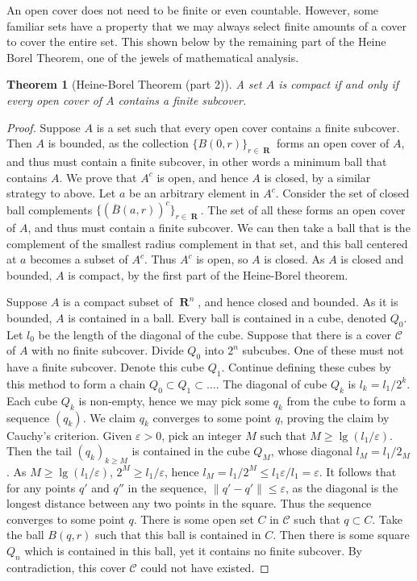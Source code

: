 \documentclass{report}
\newtheorem{theorem}{Theorem}[chapter]
\DeclareMathOperator{\real}{\mathbf{R}}
\begin{document}
An open cover does not need to be finite or even countable. However, some familiar sets have a property that we may always select finite amounts of a cover to cover the entire set. This shown below by the remaining part of the Heine Borel Theorem, one of the jewels of mathematical analysis.

\begin{theorem}[Heine-Borel Theorem (part 2)]
  A set $A$ is compact if and only if every open cover of $A$ contains a finite subcover.
\end{theorem}
\begin{proof}
  Suppose $A$ is a set such that every open cover contains a finite subcover. Then $A$ is bounded, as the collection $\{B(0,r)\}_{r \in \real}$ forms an open cover of $A$, and thus must contain a finite subcover, in other words a minimum ball that contains $A$. We prove that $A^c$ is open, and hence $A$ is closed, by a similar strategy to above. Let $a$ be an arbitrary element in $A^c$. Consider the set of closed ball complements $\{(\overline{B}(a,r))^c\}_{r \in \real}$. The set of all these forms an open cover of $A$, and thus must contain a finite subcover. We can then take a ball that is the complement of the smallest radius complement in that set, and this ball centered at $a$ becomes a subset of $A^c$. Thus $A^c$ is open, so $A$ is closed. As $A$ is closed and bounded, $A$ is compact, by the first part of the Heine-Borel theorem.

  Suppose $A$ is a compact subset of $\real^n$, and hence closed and bounded. As it is bounded, $A$ is contained in a ball. Every ball is contained in a cube, denoted $Q_0$. Let $l_0$ be the length of the diagonal of the cube. Suppose that there is a cover $\mathcal{C}$ of $A$ with no finite subcover. Divide $Q_0$ into $2^n$ subcubes. One of these must not have a finite subcover. Denote this cube $Q_1$. Continue defining these cubes by this method to form a chain $Q_0 \subset Q_1 \subset \dots$. The diagonal of cube $Q_k$ is $l_k = l_1/2^k$. Each cube $Q_k$ is non-empty, hence we may pick some $q_k$ from the cube to form a sequence $(q_k)$. We claim $q_k$ converges to some point $q$, proving the claim by Cauchy's criterion. Given $\varepsilon > 0$, pick an integer $M$ such that $M \geq \lg(l_1/\varepsilon)$. Then the tail $(q_k)_{k \geq M}$ is contained in the cube $Q_M$, whose diagonal $l_M = l_1/2_M$. As $M \geq \lg(l_1/\varepsilon)$, $2^M \geq l_1/\varepsilon$, hence $l_M = l_1/2^M \leq l_1 \varepsilon/l_1 = \varepsilon$. It follows that for any points $q'$ and $q''$ in the sequence, $\| q' - q' \| \leq \varepsilon$, as the diagonal is the longest distance between any two points in the square. Thus the sequence converges to some point $q$. There is some open set $C$ in $\mathcal{C}$ such that $q \subset C$. Take the ball $B(q,r)$ such that this ball is contained in $C$. Then there is some square $Q_n$ which is contained in this ball, yet it contains no finite subcover. By contradiction, this cover $\mathcal{C}$ could not have existed.
\end{proof}
\end{document}
